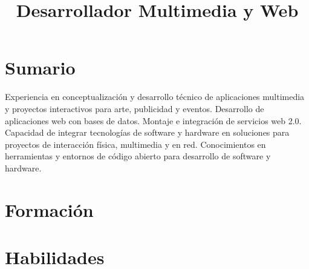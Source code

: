 \documentclass[10pt,letter]{moderncv}
\title{Desarrollador Multimedia y Web}
\begin{document}
\maketitle

\section{Sumario}
{}{Experiencia en conceptualizaci\'{o}n y desarrollo t\'{e}cnico de aplicaciones multimedia y proyectos interactivos para arte, publicidad y eventos. Desarrollo de aplicaciones web con bases de datos. Montaje e integraci\'{o}n de servicios web 2.0. Capacidad de integrar tecnolog\'{i}as de software y hardware en soluciones para proyectos de interacci\'{o}n f\'{i}sica, multimedia y en red. Conocimientos en herramientas y entornos de c\'{o}digo abierto para desarrollo de software y hardware.  
}{}{}{}{}

\section{Formaci\'{o}n}

\section{Habilidades}

\begin{comment}
\begin{itemize}
	\item[A] Lenguajes de Programacion y entornos: Python, Processing, Openframeworks ( C++ ).
	\item[A] Hardware: Arduino, Electr\'{o}nica digital, Eagle. 
	\item[Administradores de Versiones:] Git, Mercurial, Subversion.
	\item[Servidores Web:] Apache, Charokee.
	\item[Protocolos de Comunicacion:] Osc, TCP/IP, RS232.
	\item[Sistemas Operativos:] Unix/Linux, OSX.
	\item[Administracion:] ssh, ftp, bash.
	\item[Graficos:] Blender 3D, Photoshop, GIMP, Inkscape.
\end{itemize}
\end{comment}
\end{document}
